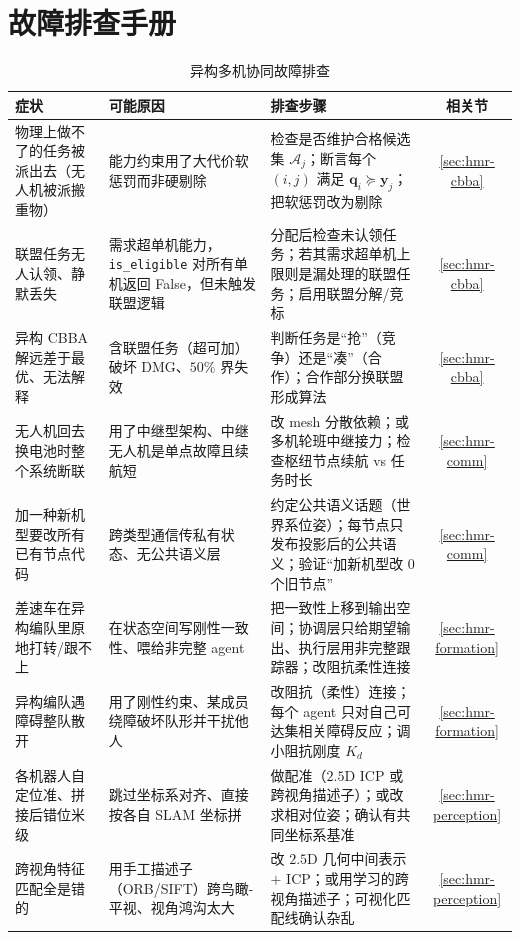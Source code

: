 \section*{故障排查手册}
\label{sec:hmr-troubleshooting}
\begin{table}[H]\centering\footnotesize
\caption{异构多机协同故障排查}
\label{tab:hmr-troubleshooting}
\begin{tabular}{p{3.4cm}p{3.4cm}p{4.2cm}c}
\toprule
症状 & 可能原因 & 排查步骤 & 相关节 \\
\midrule
物理上做不了的任务被派出去（无人机被派搬重物） & 能力约束用了大代价软惩罚而非硬剔除 & 检查是否维护合格候选集 $\mathcal{A}_j$；断言每个 $(i,j)$ 满足 $\mathbf{q}_i\succeq\mathbf{y}_j$；把软惩罚改为剔除 & \cref{sec:hmr-cbba} \\
联盟任务无人认领、静默丢失 & 需求超单机能力，\texttt{is\_eligible} 对所有单机返回 False，但未触发联盟逻辑 & 分配后检查未认领任务；若其需求超单机上限则是漏处理的联盟任务；启用联盟分解/竞标 & \cref{sec:hmr-cbba} \\
异构 CBBA 解远差于最优、无法解释 & 含联盟任务（超可加）破坏 DMG、$50\%$ 界失效 & 判断任务是“抢”（竞争）还是“凑”（合作）；合作部分换联盟形成算法 & \cref{sec:hmr-cbba} \\
无人机回去换电池时整个系统断联 & 用了中继型架构、中继无人机是单点故障且续航短 & 改 mesh 分散依赖；或多机轮班中继接力；检查枢纽节点续航 vs 任务时长 & \cref{sec:hmr-comm} \\
加一种新机型要改所有已有节点代码 & 跨类型通信传私有状态、无公共语义层 & 约定公共语义话题（世界系位姿）；每节点只发布投影后的公共语义；验证“加新机型改 $0$ 个旧节点” & \cref{sec:hmr-comm} \\
差速车在异构编队里原地打转/跟不上 & 在状态空间写刚性一致性、喂给非完整 agent & 把一致性上移到输出空间；协调层只给期望输出、执行层用非完整跟踪器；改阻抗柔性连接 & \cref{sec:hmr-formation} \\
异构编队遇障碍整队散开 & 用了刚性约束、某成员绕障破坏队形并干扰他人 & 改阻抗（柔性）连接；每个 agent 只对自己可达集相关障碍反应；调小阻抗刚度 $K_d$ & \cref{sec:hmr-formation} \\
各机器人自定位准、拼接后错位米级 & 跳过坐标系对齐、直接按各自 SLAM 坐标拼 & 做配准（$2.5\mathrm{D}$ ICP 或跨视角描述子）；或改求相对位姿；确认有共同坐标系基准 & \cref{sec:hmr-perception} \\
跨视角特征匹配全是错的 & 用手工描述子（ORB/SIFT）跨鸟瞰-平视、视角鸿沟太大 & 改 $2.5\mathrm{D}$ 几何中间表示 $+$ ICP；或用学习的跨视角描述子；可视化匹配线确认杂乱 & \cref{sec:hmr-perception} \\

\end{tabular}
\end{table}
